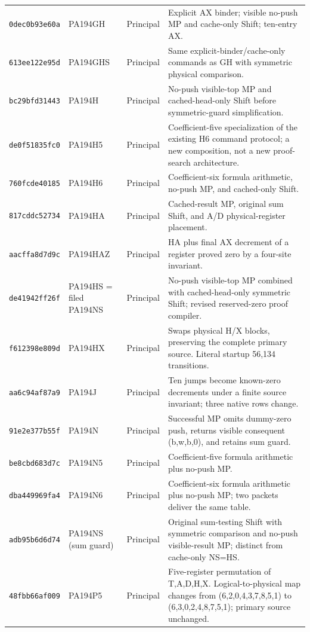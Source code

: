 {\begin{longtable}{@{}>{\raggedright\arraybackslash}p{}>{\raggedright\arraybackslash}p{}>{\raggedright\arraybackslash}p{}>{\raggedright\arraybackslash}p{}@{}}
\texttt{0dec0b93e60a} & PA194GH & Principal & Explicit AX binder; visible no-push MP and cache-only Shift; ten-entry AX.\\[3pt]
\texttt{613ee122e95d} & PA194GHS & Principal & Same explicit-binder/cache-only commands as GH with symmetric physical comparison.\\[3pt]
\texttt{bc29bfd31443} & PA194H & Principal & No-push visible-top MP and cached-head-only Shift before symmetric-guard simplification.\\[3pt]
\texttt{de0f51835fc0} & PA194H5 & Principal & Coefficient-five specialization of the existing H6 command protocol; a new composition, not a new proof-search architecture.\\[3pt]
\texttt{760fcde40185} & PA194H6 & Principal & Coefficient-six formula arithmetic, no-push MP, and cached-only Shift.\\[3pt]
\texttt{817cddc52734} & PA194HA & Principal & Cached-result MP, original sum Shift, and A/D physical-register placement.\\[3pt]
\texttt{aacffa8d7d9c} & PA194HAZ & Principal & HA plus final AX decrement of a register proved zero by a four-site invariant.\\[3pt]
\texttt{de41942ff26f} & PA194HS = filed PA194NS & Principal & No-push visible-top MP combined with cached-head-only symmetric Shift; revised reserved-zero proof compiler.\\[3pt]
\texttt{f612398e809d} & PA194HX & Principal & Swaps physical H/X blocks, preserving the complete primary source. Literal startup 56,134 transitions.\\[3pt]
\texttt{aa6c94af87a9} & PA194J & Principal & Ten jumps become known-zero decrements under a finite source invariant; three native rows change.\\[3pt]
\texttt{91e2e377b55f} & PA194N & Principal & Successful MP omits dummy-zero push, returns visible consequent (b,w,b,0), and retains sum guard.\\[3pt]
\texttt{be8cbd683d7c} & PA194N5 & Principal & Coefficient-five formula arithmetic plus no-push MP.\\[3pt]
\texttt{dba449969fa4} & PA194N6 & Principal & Coefficient-six formula arithmetic plus no-push MP; two packets deliver the same table.\\[3pt]
\texttt{adb95b6d6d74} & PA194NS (sum guard) & Principal & Original sum-testing Shift with symmetric comparison and no-push visible-result MP; distinct from cache-only NS=HS.\\[3pt]
\texttt{48fbb66af009} & PA194P5 & Principal & Five-register permutation of T,A,D,H,X. Logical-to-physical map changes from (6,2,0,4,3,7,8,5,1) to (6,3,0,2,4,8,7,5,1); primary source unchanged.\\[3pt]

\end{longtable}}
